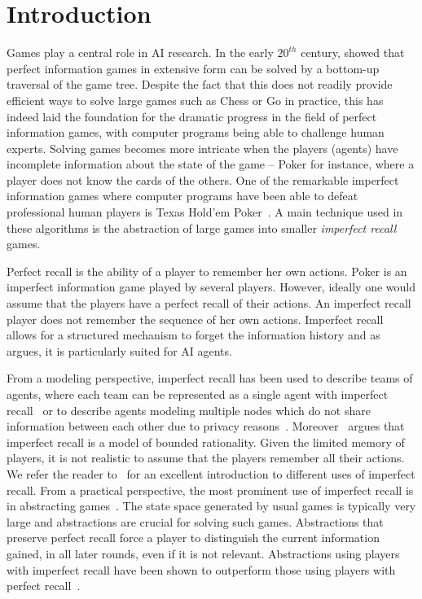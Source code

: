 

\section{Introduction}

Games play a central role in AI research. In the early $20^{th}$ century, \cite{zermelo1913} showed that perfect information games in extensive form can be solved by a bottom-up traversal of the game tree. Despite the fact that this does not readily provide efficient ways to solve large games such as Chess or Go in practice, this has indeed 
laid the foundation for the dramatic progress in the field of perfect information games, with computer programs being able to challenge human experts. Solving games becomes more intricate when the players (agents) have incomplete information about the state of the game -- Poker for instance, where a player does not know the cards of the others. One of the remarkable imperfect information games where computer programs have been able to defeat professional human players is Texas Hold'em Poker~\cite{libratus-poker,deepstack,pluribus-poker}. A main technique used in these algorithms is the abstraction of large games into smaller \emph{imperfect recall} games. 

Perfect recall is the ability of a player to remember her own actions. Poker is an imperfect information game played by several players. However, ideally one would assume that the players have a perfect recall of their actions. An imperfect recall player does not remember the sequence of her own actions. Imperfect recall allows for a structured mechanism to forget the information history and as \cite{ijcai2024p332} argues, it is particularly suited for AI agents.

From a modeling perspective, imperfect recall has been used to describe teams of agents, where each team can be represented as a single agent with imperfect recall~\cite{VONSTENGEL1997309,DBLP:conf/aaai/Celli018} or to describe agents modeling multiple nodes which do not share information between each other due to privacy reasons~\cite{DBLP:conf/aaai/Conitzer19}. Moreover~\cite{LAMBERT2019164} argues that imperfect recall is a model of bounded rationality. Given the limited memory of players, it is not realistic to assume that the players remember all their actions. We refer the reader to~\cite{ijcai2024p332} for an excellent introduction to different uses of imperfect recall.  
From a practical perspective, the most prominent use of imperfect recall is in abstracting games~\cite{PracticalUseImperfect,DBLP:conf/aaai/GanzfriedS14,DBLP:conf/atal/BrownGS15, CERMAK2020103248}. The state space generated by usual games is typically very large and abstractions are crucial for solving such games. Abstractions that preserve perfect recall force a player to distinguish the current information gained, in all later rounds, even if it is not relevant. Abstractions using players with imperfect recall have been shown to outperform those using players with perfect recall~\cite{ DBLP:conf/sara/WaughZJKSB09, johanson2013evaluating, DBLP:conf/atal/BrownGS15,DBLP:conf/ijcai/CermakBL17}.



